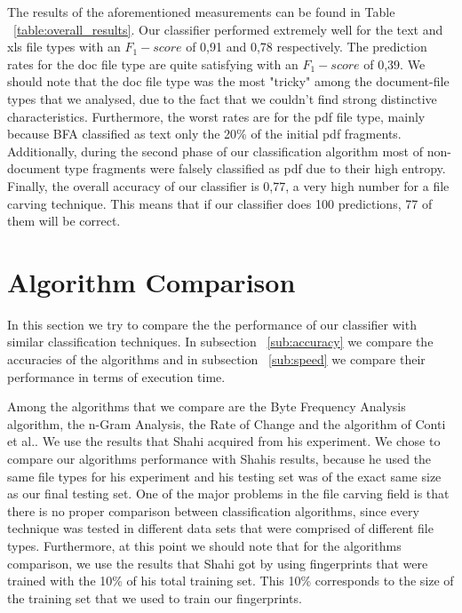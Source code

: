 The results of the aforementioned measurements can be found in Table ~\ref{table:overall_results}. Our classifier performed extremely well for the text and xls file types with an ${F_1}-score$ of 0,91 and 0,78 respectively. The prediction rates  for the doc file type are quite satisfying with an ${F_1}-score$  of 0,39. We should note that the doc file type was the most "tricky" among the document-file types that we analysed, due to the fact that we couldn't find strong distinctive characteristics. Furthermore, the worst rates are for the pdf file type, mainly because BFA classified as text only the 20\% of the initial pdf fragments. Additionally, during the second phase of our classification algorithm most of non-document type fragments were falsely classified as pdf due to their high entropy. Finally, the overall accuracy of our classifier is 0,77, a very high number for a file carving technique. This means that if our classifier does 100 predictions, 77 of them will be correct.


\section{Algorithm Comparison}
In this section we try to compare the the performance of our classifier with similar classification techniques. In subsection ~\ref{sub:accuracy} we compare the accuracies of the algorithms and in subsection ~\ref{sub:speed} we compare their performance in terms of execution time.

Among the algorithms that we compare are the Byte Frequency Analysis algorithm\cite{MacDaniel}, the n-Gram Analysis\cite{ngram}, the Rate of Change\cite{roc} and the algorithm of Conti et al.\cite{Conti}. We use the results that Shahi acquired from his experiment\cite{Ashim}. We chose to compare our algorithms performance with Shahis results, because he used the same file types for his experiment and his testing set was of the exact same size as our final testing set. One of the major problems in the file carving field is that there is no proper comparison between classification algorithms, since every technique was tested in different data sets that were comprised of different file types. Furthermore, at this point we should note that for the algorithms comparison, we use the results that Shahi got by using fingerprints that were trained with the 10\% of his total training set. This 10\% corresponds to the size of the training set that we used to train our fingerprints.


